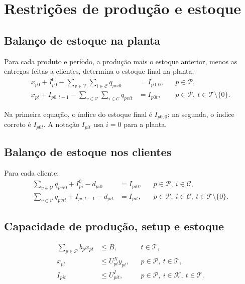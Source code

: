 \documentclass[11pt,a4paper]{article}
\newcommand{\set}[1]{\mathcal{#1}}
\begin{document}
\section{Restrições de produção e estoque}

\subsection{Balanço de estoque na planta}

Para cada produto e período, a produção mais o estoque anterior, menos as
entregas feitas a clientes, determina o estoque final na planta:
\begin{align}
  x_{p0}+I^0_{p0}-\sum_{v\in\set{V}}\sum_{i\in\set{C}}q_{pvi0}
    &= I_{p0,0}, && p\in\set{P}, \label{eq:plant-balance-initial}\\
  x_{pt}+I_{p0,t-1}-\sum_{v\in\set{V}}\sum_{i\in\set{C}}q_{pvit}
    &= I_{p0t}, && p\in\set{P},\ t\in\set{T}\setminus\{0\}.
  \label{eq:plant-balance}
\end{align}

Na primeira equação, o índice do estoque final é $I_{p0,0}$; na segunda,
o índice correto é $I_{p0t}$. A notação $I_{pit}$ usa $i=0$ para a planta.

\subsection{Balanço de estoque nos clientes}

Para cada cliente:
\begin{align}
  \sum_{v\in\set{V}}q_{pvi0}+I^0_{pi}-d_{pi0}
    &= I_{pi0}, && p\in\set{P},\ i\in\set{C}, \label{eq:customer-balance-initial}\\
  \sum_{v\in\set{V}}q_{pvit}+I_{pi,t-1}-d_{pit}
    &= I_{pit}, && p\in\set{P},\ i\in\set{C},\ t\in\set{T}\setminus\{0\}.
  \label{eq:customer-balance}
\end{align}

\subsection{Capacidade de produção, setup e estoque}

\begin{align}
  \sum_{p\in\set{P}} b_p x_{pt} &\le B,
  && t\in\set{T}, \label{eq:production-capacity}\\
  x_{pt} &\le U^X_{pt} y_{pt},
  && p\in\set{P},\ t\in\set{T}, \label{eq:setup-link}\\
  I_{pit} &\le U^I_{pit},
  && p\in\set{P},\ i\in\set{K},\ t\in\set{T}.
  \label{eq:inventory-capacity}
\end{align}
\end{document}
